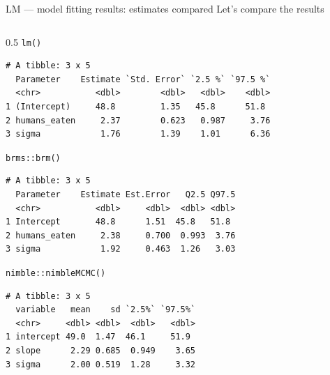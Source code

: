 \documentclass[
  10pt,
  ignorenonframetext,
  aspectratio=169,
  t]{beamer}
\let\oldtexttt\texttt
\renewcommand{\texttt}[1]{\colorbox{gray!20}{\oldtexttt{#1}}}
\begin{document}
\begin{frame}[fragile]{LM --- model fitting results: estimates compared}
\protect{}\label{lm-model-fitting-results-estimates-compared}
Let's compare the results

\begin{columns}[T]
\begin{column}{0.5\linewidth}
\texttt{lm()}

\scriptsize

\begin{verbatim}
# A tibble: 3 x 5
  Parameter    Estimate `Std. Error` `2.5 %` `97.5 %`
  <chr>           <dbl>        <dbl>   <dbl>    <dbl>
1 (Intercept)     48.8         1.35   45.8      51.8 
2 humans_eaten     2.37        0.623   0.987     3.76
3 sigma            1.76        1.39    1.01      6.36
\end{verbatim}

\normalsize

\texttt{brms::brm()}

\scriptsize

\begin{verbatim}
# A tibble: 3 x 5
  Parameter    Estimate Est.Error   Q2.5 Q97.5
  <chr>           <dbl>     <dbl>  <dbl> <dbl>
1 Intercept       48.8      1.51  45.8   51.8 
2 humans_eaten     2.38     0.700  0.993  3.76
3 sigma            1.92     0.463  1.26   3.03
\end{verbatim}

\normalsize

\texttt{nimble::nimbleMCMC()}

\scriptsize

\begin{verbatim}
# A tibble: 3 x 5
  variable   mean    sd `2.5%` `97.5%`
  <chr>     <dbl> <dbl>  <dbl>   <dbl>
1 intercept 49.0  1.47  46.1     51.9 
2 slope      2.29 0.685  0.949    3.65
3 sigma      2.00 0.519  1.28     3.32
\end{verbatim}

\normalsize
\end{column}

\pause


\end{columns}
\end{frame}
\end{document}
